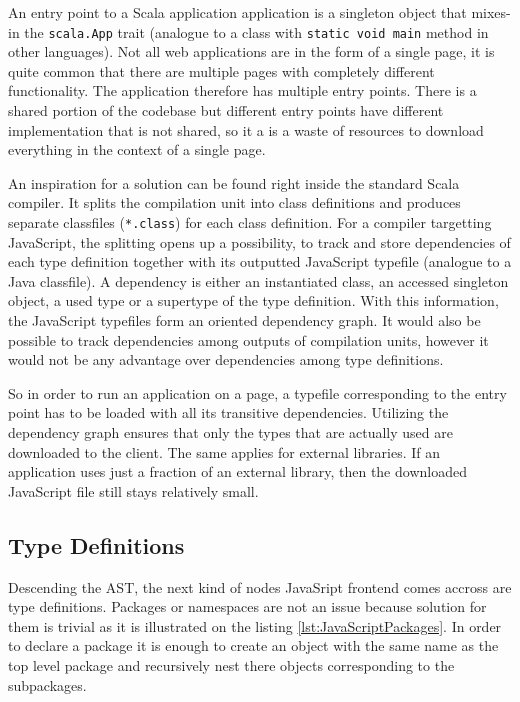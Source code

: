 \documentclass[12pt,a4paper]{report}
\begin{document}
An entry point to a Scala application application is a singleton object that mixes-in the \texttt{scala.App} trait (analogue to a class with \texttt{static void main} method in other languages). Not all web applications are in the form of a single page, it is quite common that there are multiple pages with completely different functionality. The application therefore has multiple entry points. There is a shared portion of the codebase but different entry points have different implementation that is not shared, so it a is a waste of resources to download everything in the context of a single page.

An inspiration for a solution can be found right inside the standard Scala compiler. It splits the compilation unit into class definitions and produces separate classfiles (\texttt{*.class}) for each class definition. For a compiler targetting JavaScript, the splitting opens up a possibility, to track and store dependencies of each type definition together with its outputted JavaScript typefile (analogue to a Java classfile). A dependency is either an instantiated class, an accessed singleton object, a used type or a supertype of the type definition. With this information, the JavaScript typefiles form an oriented dependency graph. It would also be possible to track dependencies among outputs of compilation units, however it would not be any advantage over dependencies among type definitions.

So in order to run an application on a page, a typefile corresponding to the entry point has to be loaded with all its transitive dependencies. Utilizing the dependency graph ensures that only the types that are actually used are downloaded to the client. The same applies for external libraries. If an application uses just a fraction of an external library, then the downloaded JavaScript file still stays relatively small.

\subsection{Type Definitions}

Descending the AST, the next kind of nodes JavaSript frontend comes accross are type definitions. Packages or namespaces are not an issue because solution for them is trivial as it is illustrated on the listing \ref{lst:JavaScriptPackages}. In order to declare a package it is enough to create an object with the same name as the top level package and recursively nest there objects corresponding to the subpackages.
\end{document}
